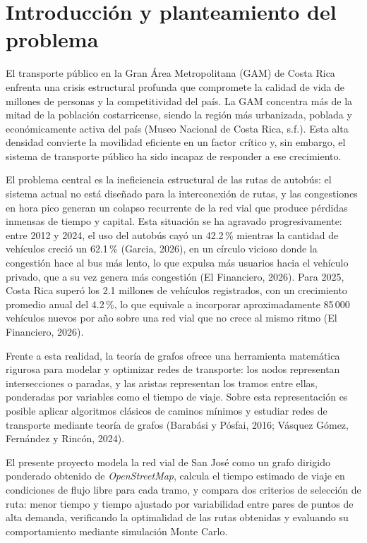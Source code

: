 \documentclass[11pt]{article}
\numberwithin{equation}{section}
\begin{document}
\section{Introducción y planteamiento del problema}\label{sec:introduccion}

El transporte público en la Gran Área Metropolitana (GAM) de Costa Rica enfrenta una crisis estructural profunda que compromete la calidad de vida de millones de personas y la competitividad del país. La GAM concentra más de la mitad de la población costarricense, siendo la región más urbanizada, poblada y económicamente activa del país (Museo Nacional de Costa Rica, s.f.). Esta alta densidad convierte la movilidad eficiente en un factor crítico y, sin embargo, el sistema de transporte público ha sido incapaz de responder a ese crecimiento.

El problema central es la ineficiencia estructural de las rutas de autobús: el sistema actual no está diseñado para la interconexión de rutas, y las congestiones en hora pico generan un colapso recurrente de la red vial que produce pérdidas inmensas de tiempo y capital. Esta situación se ha agravado progresivamente: entre 2012 y 2024, el uso del autobús cayó un 42.2\,\% mientras la cantidad de vehículos creció un 62.1\,\% (Garcia, 2026), en un círculo vicioso donde la congestión hace al bus más lento, lo que expulsa más usuarios hacia el vehículo privado, que a su vez genera más congestión (El Financiero, 2026). Para 2025, Costa Rica superó los 2.1 millones de vehículos registrados, con un crecimiento promedio anual del 4.2\,\%, lo que equivale a incorporar aproximadamente 85\,000 vehículos nuevos por año sobre una red vial que no crece al mismo ritmo (El Financiero, 2026).

Frente a esta realidad, la teoría de grafos ofrece una herramienta matemática rigurosa para modelar y optimizar redes de transporte: los nodos representan intersecciones o paradas, y las aristas representan los tramos entre ellas, ponderadas por variables como el tiempo de viaje. Sobre esta representación es posible aplicar algoritmos clásicos de caminos mínimos y estudiar redes de transporte mediante teoría de grafos (Barabási y Pósfai, 2016; Vásquez Gómez, Fernández y Rincón, 2024).

El presente proyecto modela la red vial de San José como un grafo dirigido ponderado obtenido de \textit{OpenStreetMap}, calcula el tiempo estimado de viaje en condiciones de flujo libre para cada tramo, y compara dos criterios de selección de ruta: menor tiempo y tiempo ajustado por variabilidad entre pares de puntos de alta demanda, verificando la optimalidad de las rutas obtenidas y evaluando su comportamiento mediante simulación Monte Carlo.
\end{document}
